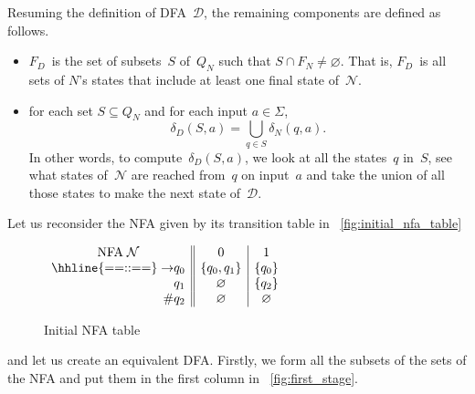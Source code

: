 Resuming the definition of DFA~\(\mathcal{D}\), the remaining
components are defined as follows.
\begin{itemize}

  \item \(F_D\)~is the set of subsets~\(S\) of~\(Q_N\) such that \(S
    \cap F_N \neq \varnothing\). That is, \(F_D\)~is all sets of
    \(N\)'s states that include at least one final state
    of~\(\mathcal{N}\).

  \item for each set \(S \subseteq Q_N\) and for each input \(a \in
    \Sigma\),
  \begin{equation*}
    \delta_D(S, a) = \bigcup_{q \in S}{\delta_N (q, a)}.
  \end{equation*}
  In other words, to compute~\(\delta_D (S, a)\), we look at all the
  states~\(q\) in~\(S\), see what states of~\(\mathcal{N}\) are
  reached from~\(q\) on input~\(a\) and take the union of all those
  states to make the next state of~\(\mathcal{D}\).

\end{itemize}
Let us reconsider the NFA given by its transition table in
\fig~\vref{fig:initial_nfa_table}
\begin{figure}
\centering
\(\begin{array}{r@{}l||c|c}
    \multicolumn{2}{c||}{\text{NFA} \; \mathcal{N}} & 0 & 1\\
    \hhline{==::==}
    \rightarrow & q_0 & \{q_0, q_1\} & \{q_0\}\\
                & q_1 & \varnothing  & \{q_2\}\\
    \#          & q_2 & \varnothing  & \varnothing
\end{array}\)
\caption{Initial NFA table}
\label{fig:initial_nfa_table}
\end{figure}
and let us create an equivalent DFA. Firstly, we form all the subsets
of the sets of the NFA and put them in the first column in
\fig~\vref{fig:first_stage}.
